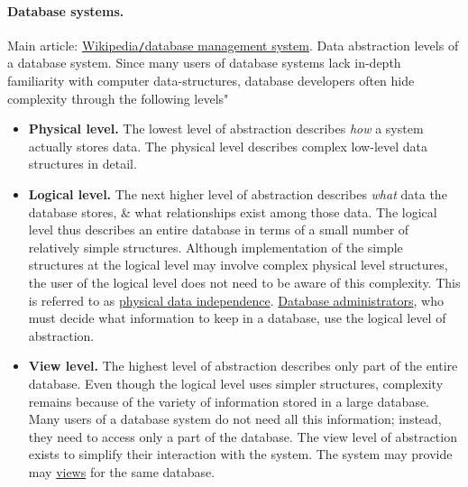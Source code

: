 \documentclass{article}
\begin{document}
\paragraph{Database systems.} Main article: \href{https://en.wikipedia.org/wiki/Database_management_system}{Wikipedia{\tt/}database management system}. {\sf Data abstraction levels of a database system}. Since many users of database systems lack in-depth familiarity with computer data-structures, database developers often hide complexity through the following levels"
\begin{itemize}
	\item {\bf Physical level.} The lowest level of abstraction describes {\it how} a system actually stores data. The physical level describes complex low-level data structures in detail.
	\item {\bf Logical level.} The next higher level of abstraction describes {\it what} data the database stores, \& what relationships exist among those data. The logical level thus describes an entire database in terms of a small number of relatively simple structures. Although implementation of the simple structures at the logical level may involve complex physical level structures, the user of the logical level does not need to be aware of this complexity. This is referred to as \href{https://en.wikipedia.org/wiki/Physical_data_independence}{physical data independence}. \href{https://en.wikipedia.org/wiki/Database_administrator}{Database administrators}, who must decide what information to keep in a database, use the logical level of abstraction.
	\item {\bf View level.} The highest level of abstraction describes only part of the entire database. Even though the logical level uses simpler structures, complexity remains because of the variety of information stored in a large database. Many users of a database system do not need all this information; instead, they need to access only a part of the database. The view level of abstraction exists to simplify their interaction with the system. The system may provide may \href{https://en.wikipedia.org/wiki/View_(database)}{views} for the same database.
\end{itemize}
\end{document}
